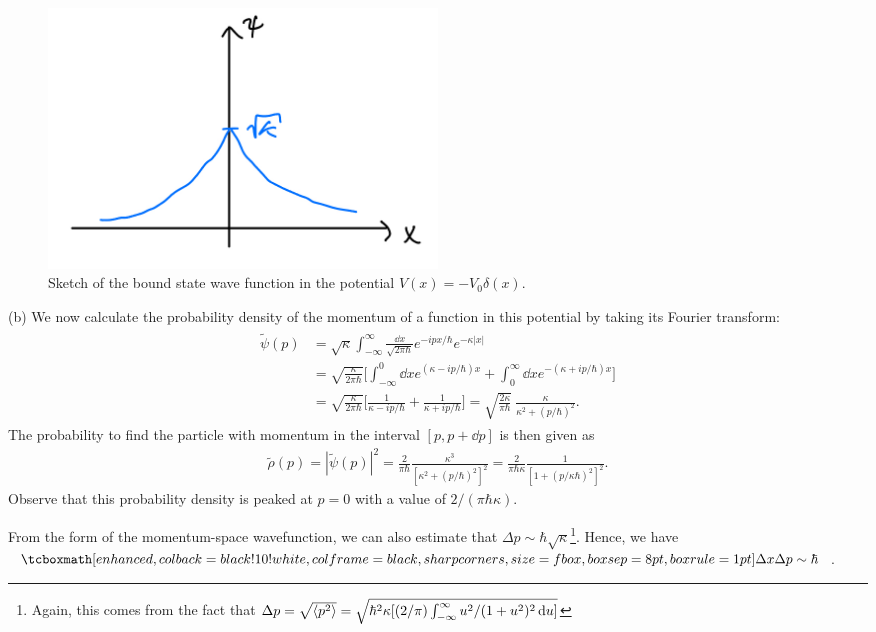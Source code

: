 {\begin{figure}[h!]
   \centering
   \includegraphics[width=0.5\textwidth]{prob3.jpeg}
   \caption{Sketch of the bound state wave function in the potential $V(x) = -V_0 \delta(x)$. 
    }
   \label{fig:prob3a}
\end{figure}

(b) We now calculate the probability density of the momentum of a function in this potential by taking its Fourier transform:
\begin{eqnarray}
    \begin{aligned}
        \tilde{\psi}(p) &= \sqrt{\kappa} \int_{-\infty}^{\infty} \frac{\dd{x}}{\sqrt{2 \pi \hbar}} e^{-i p x / \hbar} e^{-\kappa |x|} \\
                        &= \sqrt{\frac{\kappa}{2 \pi \hbar}} \Big[ \int_{-\infty}^{0} \dd{x} e^{(\kappa - i p / \hbar) x} + \int_{0}^{\infty} \dd{x} e^{-( \kappa + ip / \hbar ) x} \Big] \\
                        &= \sqrt{\frac{\kappa}{2 \pi \hbar}} \Big[ \frac{1}{\kappa - ip/\hbar} + \frac{1}{\kappa + ip/\hbar} \Big] = \sqrt{\frac{2 \kappa}{\pi \hbar}} ~ \frac{\kappa}{\kappa^2 + (p / \hbar)^2}
    .\end{aligned}
\end{eqnarray}
The probability to find the particle with momentum in the interval $[p,p+\dd{p}]$ is then given as
\begin{eqnarray}
    \tilde{\rho}(p) = |\tilde{\psi}(p)|^2 = \frac{2}{\pi \hbar} \frac{\kappa^3}{[\kappa^2 + (p/\hbar)^2]^2} = \frac{2}{\pi \hbar \kappa} \frac{1}{[1 + (p/\kappa \hbar)^2]^2}
.\end{eqnarray}
Observe that this probability density is peaked at $p = 0$ with a value of $2/(\pi \hbar \kappa)$.

From the form of the momentum-space wavefunction, we can also estimate that $\Delta p \sim \hbar \sqrt{\kappa}$\footnote{Again, this comes from the fact that $\Delta p = \sqrt{\expval{p^2}} = \sqrt{\hbar^2 \kappa [ (2/\pi)\int_{-\infty}^{\infty} u^2/(1 + u^2)^2 \dd{u} ]}$}.
Hence, we have $\eqbox{ \Delta x \Delta p \sim \hbar }$.

}


